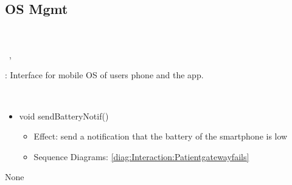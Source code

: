   \subsection{OS Mgmt}\label{int:InterfacesOSMgmt}
    \begin{description}
      \item[Provided by:] \iconcomponent{}~
      \item[Required by:] \iconcomponent{}~, \iconcomponent{}~ 
           \item[Description]: Interface for mobile OS of users phone and the app. 
      \item[Operations:] ~
    \begin{itemize}[noitemsep,nolistsep,leftmargin=-.25cm]
      \item \textsf{void sendBatteryNotif()}
        \begin{itemize}[noitemsep,nolistsep]
           \item Effect: send a notification that the battery of the smartphone is low 
           \item Sequence Diagrams: \cref{diag:Interaction:Patientgatewayfails}
        \end{itemize}
    \end{itemize}
      \item[Diagrams:] None
    \end{description}

